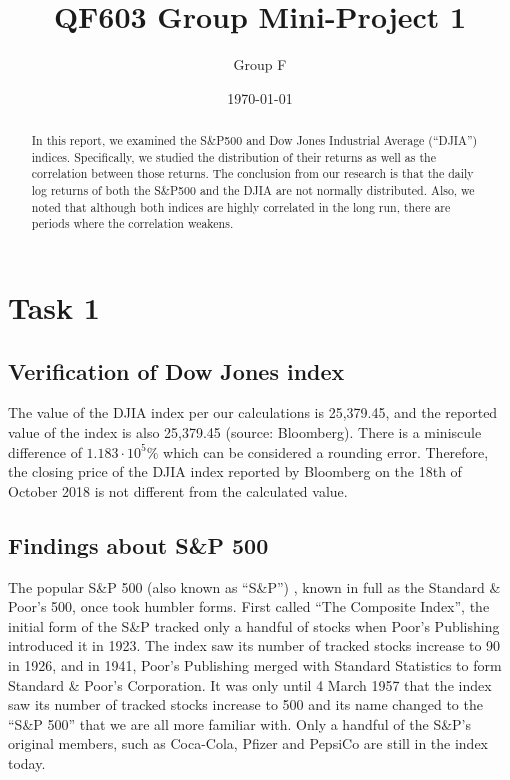 \documentclass[a4paper]{article}
\title{QF603 Group Mini-Project 1}
\author{Group F}
\date{\today}
\begin{document}
	\maketitle
	
	\begin{abstract}
		In this report, we examined the S\&P500 and Dow Jones Industrial Average (``DJIA'') indices. Specifically, we studied the distribution of their returns as well as the correlation between those returns. The conclusion from our research is that the daily log returns of both the S\&P500 and the DJIA are not normally distributed. Also, we noted that although both indices are highly correlated in the long run, there are periods where the correlation weakens.
	\end{abstract} 
	
	\section{Task 1}
	\label{sec:introduction}
	
	\subsection{Verification of Dow Jones index}
	The value of the DJIA index per our calculations is 25,379.45, and the reported value of the index is also 25,379.45 (source: Bloomberg). There is a miniscule difference of $1.183\cdot10^5\%$ which can be considered a rounding error. Therefore, the closing price of the DJIA index reported by Bloomberg on the 18th of October 2018 is not different from the calculated value.
	
	
	\subsection{Findings about S\&P 500}
	The popular S\&P 500 (also known as ``S\&P'') , known in full as the Standard \& Poor’s 500, once took humbler forms. First called “The Composite Index”, the initial form of the S\&P tracked only a handful of stocks when Poor’s Publishing introduced it in 1923. The index saw its number of tracked stocks increase to 90 in 1926, and in 1941, Poor’s Publishing merged with Standard Statistics to form Standard \& Poor’s Corporation. It was only until 4 March 1957 that the index saw its number of tracked stocks increase to 500 and its name changed to the “S\&P 500” that we are all more familiar with. Only a handful of the S\&P’s original members, such as Coca-Cola, Pfizer and PepsiCo are still in the index today.
	
\end{document}
